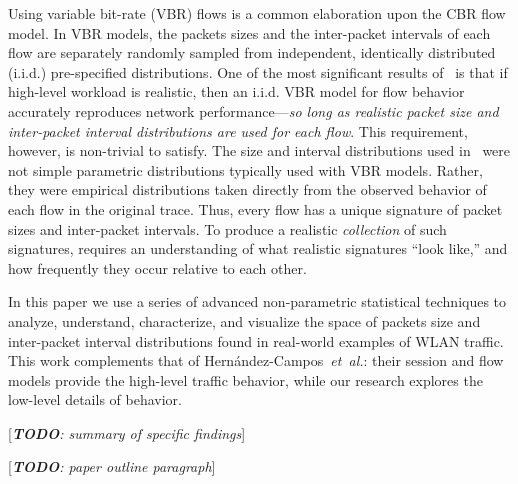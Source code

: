 \documentclass[conference]{IEEEtran}
\newcommand{\caps}[1]{{\small{#1}}}
\newcommand{\todo}[1]{[\textit{\textbf{TODO}: {#1}}]}
\begin{document}
Using variable bit-rate (\caps{VBR}) flows is a common elaboration upon the \caps{CBR} flow model. In \caps{VBR} models, the packets sizes and the inter-packet intervals of each flow are separately randomly sampled from independent, identically distributed (i.i.d.) pre-specified distributions.
One of the most significant results of~\cite{Karpinski07:realism} is that if high-level workload is realistic, then an i.i.d. \caps{VBR} model for flow behavior accurately reproduces network performance---\textit{so long as realistic packet size and inter-packet interval distributions are used for each flow}. This requirement, however, is non-trivial to satisfy. The size and interval distributions used in~\cite{Karpinski07:realism} were not simple parametric distributions typically used with \caps{VBR} models. Rather, they were empirical distributions taken directly from the observed behavior of each flow in the original trace. Thus, every flow has a unique signature of packet sizes and inter-packet intervals. To produce a realistic \textit{collection} of such signatures, requires an understanding of what realistic signatures ``look like,'' and how frequently they occur relative to each other.

In this paper we use a series of advanced non-parametric statistical techniques
to analyze, understand, characterize, and visualize the space of packets size and inter-packet interval distributions found in real-world examples of \caps{WLAN} traffic. This work complements that of Hern\'andez-Campos~\textit{et~al.}: their session and flow models provide the high-level traffic behavior, while our research explores the low-level details of behavior.%

\todo{summary of specific findings}

\todo{paper outline paragraph}

\end{document}
